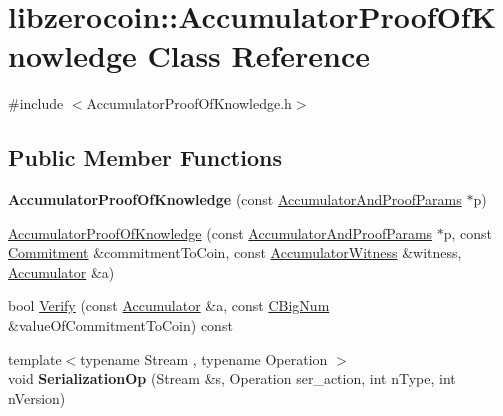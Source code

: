 \hypertarget{classlibzerocoin_1_1_accumulator_proof_of_knowledge}{}\section{libzerocoin\+:\+:Accumulator\+Proof\+Of\+Knowledge Class Reference}
\label{classlibzerocoin_1_1_accumulator_proof_of_knowledge}


{\ttfamily \#include $<$Accumulator\+Proof\+Of\+Knowledge.\+h$>$}

\subsection*{Public Member Functions}
\begin{DoxyCompactItemize}
\item 
\mbox{\label{classlibzerocoin_1_1_accumulator_proof_of_knowledge_a4eb3b653681682cce8a9bc42b231efeb}} 
{\bfseries Accumulator\+Proof\+Of\+Knowledge} (const \mbox{\hyperlink{classlibzerocoin_1_1_accumulator_and_proof_params}{Accumulator\+And\+Proof\+Params}} $\ast$p)
\item 
\mbox{\hyperlink{classlibzerocoin_1_1_accumulator_proof_of_knowledge_acce987e79e2498918495c3a7e8873810}{Accumulator\+Proof\+Of\+Knowledge}} (const \mbox{\hyperlink{classlibzerocoin_1_1_accumulator_and_proof_params}{Accumulator\+And\+Proof\+Params}} $\ast$p, const \mbox{\hyperlink{classlibzerocoin_1_1_commitment}{Commitment}} \&commitment\+To\+Coin, const \mbox{\hyperlink{classlibzerocoin_1_1_accumulator_witness}{Accumulator\+Witness}} \&witness, \mbox{\hyperlink{classlibzerocoin_1_1_accumulator}{Accumulator}} \&a)
\item 
bool \mbox{\hyperlink{classlibzerocoin_1_1_accumulator_proof_of_knowledge_afa37fa003c2e3ce95e00525fe84d1e52}{Verify}} (const \mbox{\hyperlink{classlibzerocoin_1_1_accumulator}{Accumulator}} \&a, const \mbox{\hyperlink{class_c_big_num}{C\+Big\+Num}} \&value\+Of\+Commitment\+To\+Coin) const
\item 
\mbox{\label{classlibzerocoin_1_1_accumulator_proof_of_knowledge_af89207ab552bd8a0474334ff37f8efee}} 
{\footnotesize template$<$typename Stream , typename Operation $>$ }\\void {\bfseries Serialization\+Op} (Stream \&s, Operation ser\+\_\+action, int n\+Type, int n\+Version)
\end{DoxyCompactItemize}

